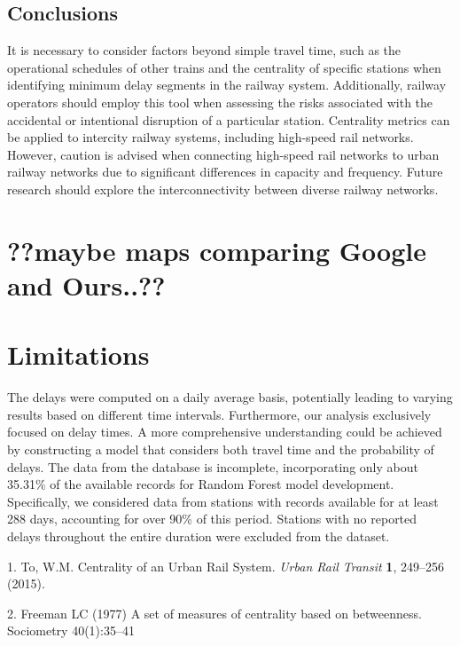 \documentclass{article}
\theoremstyle{plain}
\theoremstyle{definition}
\theoremstyle{remark}
\begin{document}
\subsection{{Conclusions}}

It is necessary to consider factors beyond simple travel time, such as the operational schedules of other trains and the centrality of specific stations when identifying minimum delay segments in the railway system. Additionally, railway operators should employ this tool when assessing the risks associated with the accidental or intentional disruption of a particular station. Centrality metrics can be applied to intercity railway systems, including high-speed rail networks. However, caution is advised when connecting high-speed rail networks to urban railway networks due to significant differences in capacity and frequency. Future research should explore the interconnectivity between diverse railway networks.

\section{??maybe maps comparing Google and Ours..??}



\section{Limitations}


The delays were computed on a daily average basis, potentially leading to varying results based on different time intervals. Furthermore, our analysis exclusively focused on delay times. A more comprehensive understanding could be achieved by constructing a model that considers both travel time and the probability of delays. The data from the database is incomplete, incorporating only about 35.31\% of the available records for Random Forest model development. Specifically, we considered data from stations with records available for at least 288 days, accounting for over 90\% of this period. Stations with no reported delays throughout the entire duration were excluded from the dataset. 


1. To, W.M. Centrality of an Urban Rail System. \textit{Urban Rail Transit} \textbf{1}, 249–256 (2015).

2. Freeman LC (1977) A set of measures of centrality based on betweenness. Sociometry 40(1):35–41

\end{document}
